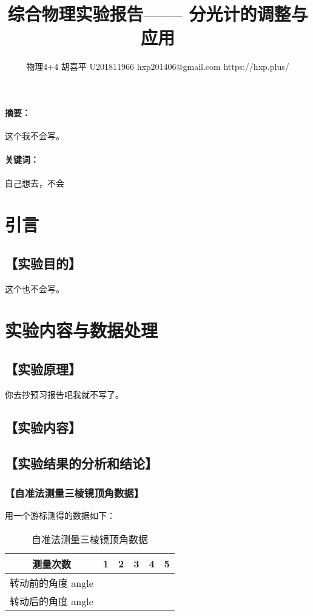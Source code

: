 \documentclass{ctexart}
\date{}
\newcommand{\generatetitle}[6]{\title{\zihao{3}\heiti#1} \author{#2 \quad
    \quad #3 \quad\quad #4 \quad\quad #5 \quad\quad #6} \maketitle\thispagestyle{fancy}}
\let\oldsubsection\subsection
\renewcommand{\subsection}[1]{\oldsubsection{\!\!\!\!\!\!【#1】}}
\let\oldsubsubsection\subsubsection
\renewcommand{\subsubsection}[1]{\oldsubsubsection{\!\!\!\!\!\!【#1】}}
\let\oldparagraph\paragraph
\renewcommand{\paragraph}[1]{\oldparagraph{#1：\!\!\!\!\!\!}}
\begin{document}
\generatetitle{综合物理实验报告——
  分光计的调整与应用}{物理4+4}{胡喜平}{U201811966}{hxp201406@gmail.com}{https://hxp.plus/}

\paragraph{摘要}
这个我不会写。

\paragraph{关键词}
自己想去，不会

\section{引言}
\subsection{实验目的}

这个也不会写。

\section{实验内容与数据处理}
\subsection{实验原理}

你去抄预习报告吧我就不写了。

\subsection{实验内容}

\subsection{实验结果的分析和结论}

\subsubsection{自准法测量三棱镜顶角数据}

用一个游标测得的数据如下：

\begin{table}[H]
  \centering
  \begin{tabular}{|c|c|c|c|c|c|}
    \hline
     测量次数           & 1 & 2 & 3 & 4 & 5 
     \\\hline
     转动前的角度 {{ angle }}\\\hline
     转动后的角度 {{ angle }}\\\hline
  \end{tabular}
  \caption{自准法测量三棱镜顶角数据}
\end{table}
\end{document}
